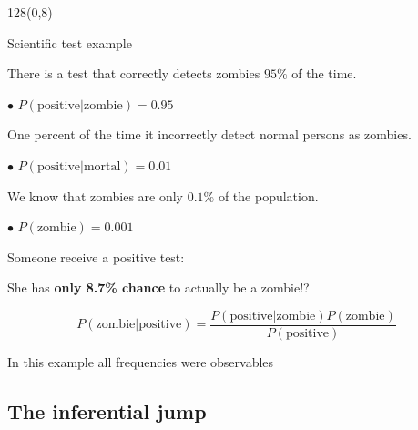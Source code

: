 \documentclass[shownotes]{beamer}
\begin{document}
\begin{frame}
\begin{textblock}{128}(0,8)
\begin{center}
 \large Scientific test example
\end{center}
\end{textblock}
\vspace{0.5cm}


{ \footnotesize
 There is a test that correctly detects zombies $95\%$ of the time.
 
 $\bullet$ $P(\text{positive}|\text{zombie})=0.95$
 
 \pause \medskip 

 One percent of the time it incorrectly detect normal persons as zombies.
 
 $\bullet$ $P(\text{positive}|\text{mortal})=0.01$
 
 \pause \medskip 
 
 We know that zombies are only $0.1\%$ of the population. 
 
 $\bullet$ $P(\text{zombie})=0.001$

}

\pause

\begin{center}
 Someone receive a positive test: 
 
 \pause
 She has \textbf{only 8.7\% chance} to actually be a zombie!?
\end{center}

\begin{equation*}
 P(\text{zombie}|\text{positive}) = \frac{P(\text{positive}|\text{zombie})P(\text{zombie})}{P(\text{positive})}
\end{equation*}

\pause


\begin{mdframed}[backgroundcolor=black!15]
 \centering \normalsize
 In this example all frequencies were observables
\end{mdframed}

\end{frame}


\subsection{The inferential jump}
\end{document}
